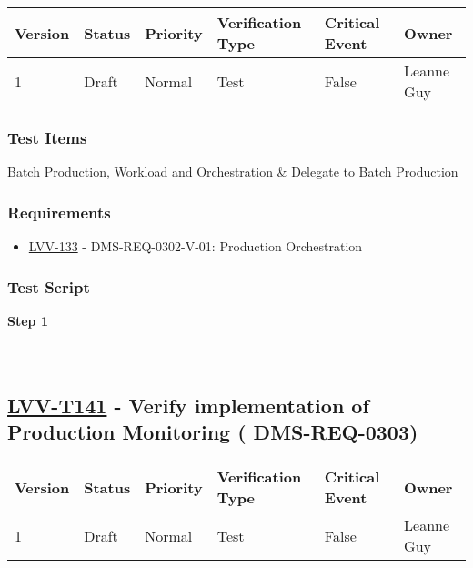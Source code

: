 \begin{longtable}[]{@{}llllll@{}}
\toprule
Version & Status & Priority & Verification Type & Critical Event &
Owner\tabularnewline
\midrule
\endhead
1 & Draft & Normal & Test & False & Leanne Guy\tabularnewline
\bottomrule
\end{longtable}

\hypertarget{test-items-116}{%
\subsubsection{Test Items}\label{test-items-116}}

Batch Production, Workload and Orchestration \& Delegate to Batch
Production

\hypertarget{requirements-117}{%
\subsubsection{Requirements}\label{requirements-117}}

\begin{itemize}
\tightlist
\item
  \href{https://jira.lsstcorp.org/browse/LVV-133}{LVV-133} -
  DMS-REQ-0302-V-01: Production Orchestration
\end{itemize}

\hypertarget{test-script-117}{%
\subsubsection{Test Script}\label{test-script-117}}

\textbf{Step 1}\\
~\\
~\\

\hypertarget{lvv-t141---verify-implementation-of-production-monitoring-dms-req-0303}{%
\subsection{\texorpdfstring{\href{https://jira.lsstcorp.org/secure/Tests.jspa\#/testCase/LVV-T141}{LVV-T141}
- Verify implementation of Production Monitoring (
DMS-REQ-0303)}{LVV-T141 - Verify implementation of Production Monitoring ( DMS-REQ-0303)}}\label{lvv-t141---verify-implementation-of-production-monitoring-dms-req-0303}}

\begin{longtable}[]{@{}llllll@{}}
\toprule
Version & Status & Priority & Verification Type & Critical Event &
Owner\tabularnewline
\midrule
\endhead
1 & Draft & Normal & Test & False & Leanne Guy\tabularnewline
\bottomrule
\end{longtable}

